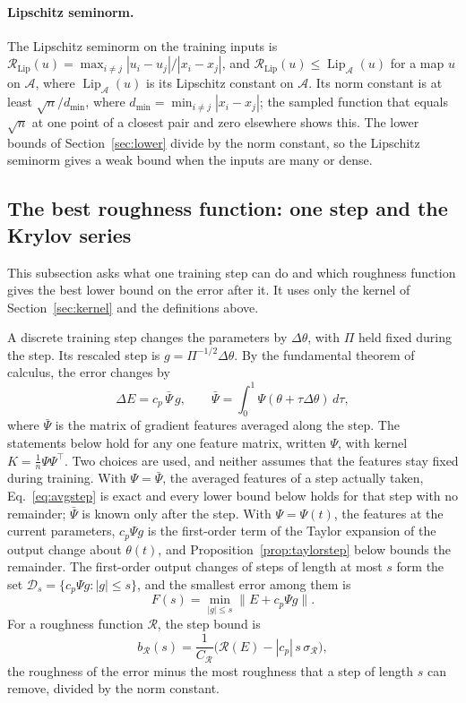 \documentclass[11pt]{article}
\theoremstyle{definition}
\theoremstyle{remark}
\newcommand{\Aset}{\mathcal{A}}          %
\newcommand{\Lip}{\operatorname{Lip}_{\Aset}}
\newcommand{\Rgh}{\mathcal{R}}           %
\newcommand{\Lipn}{\Rgh_{\mathrm{Lip}}}  %
\newcommand{\sR}{\sigma_{\Rgh}}
\newcommand{\CR}{C_{\Rgh}}
\begin{document}
\paragraph{Lipschitz seminorm.}
The Lipschitz seminorm on the training inputs is $\Lipn(u) = \max_{i\neq j}|u_i - u_j|/|x_i - x_j|$, and $\Lipn(u) \le \Lip(u)$ for a map $u$ on $\Aset$, where $\Lip(u)$ is its Lipschitz constant on $\Aset$.
Its norm constant is at least $\sqrt n/d_{\min}$, where $d_{\min} = \min_{i\neq j}|x_i - x_j|$; the sampled function that equals $\sqrt n$ at one point of a closest pair and zero elsewhere shows this.
The lower bounds of Section~\ref{sec:lower} divide by the norm constant, so the Lipschitz seminorm gives a weak bound when the inputs are many or dense.

\subsection{The best roughness function: one step and the Krylov series}\label{sec:step}\label{sec:krylov}

This subsection asks what one training step can do and which roughness function gives the best lower bound on the error after it.
It uses only the kernel of Section~\ref{sec:kernel} and the definitions above.

A discrete training step changes the parameters by $\Delta\theta$, with $\Pi$ held fixed during the step.
Its rescaled step is $g = \Pi^{-1/2}\Delta\theta$.
By the fundamental theorem of calculus, the error changes by
\begin{equation}\label{eq:avgstep}
\Delta E = c_p\,\bar\Psi\,g, \qquad \bar\Psi = \int_0^1 \Psi(\theta + \tau\Delta\theta)\,d\tau,
\end{equation}
where $\bar\Psi$ is the matrix of gradient features averaged along the step.
The statements below hold for any one feature matrix, written $\Psi$, with kernel $K = \tfrac1n\Psi\Psi^\top$.
Two choices are used, and neither assumes that the features stay fixed during training.
With $\Psi = \bar\Psi$, the averaged features of a step actually taken, Eq.~\eqref{eq:avgstep} is exact and every lower bound below holds for that step with no remainder; $\bar\Psi$ is known only after the step.
With $\Psi = \Psi(t)$, the features at the current parameters, $c_p\Psi g$ is the first-order term of the Taylor expansion of the output change about $\theta(t)$, and Proposition~\ref{prop:taylorstep} below bounds the remainder.
The first-order output changes of steps of length at most $s$ form the set $\mathcal{D}_s = \{c_p\Psi g : |g| \le s\}$, and the smallest error among them is
\begin{equation}\label{eq:Fs}
F(s) = \min_{|g|\le s}\|E + c_p\Psi g\| .
\end{equation}
For a roughness function $\Rgh$, the step bound is
\begin{equation}\label{eq:bR}
b_\Rgh(s) = \frac{1}{\CR}\Big(\Rgh(E) - |c_p|\,s\,\sR\Big),
\end{equation}
the roughness of the error minus the most roughness that a step of length $s$ can remove, divided by the norm constant.
\end{document}

